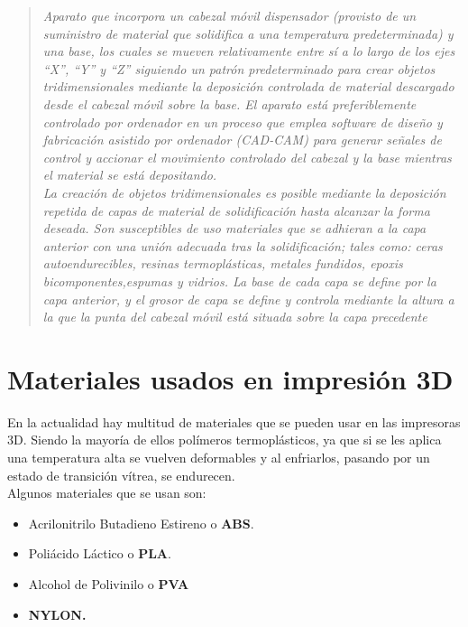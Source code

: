 \begin{quotation}
    \emph{
    Aparato que incorpora un cabezal móvil dispensador (provisto de un suministro de material que solidifica a una temperatura predeterminada) y una base, los cuales se mueven relativamente entre sí a lo largo de los ejes “X”, “Y” y “Z” siguiendo un patrón predeterminado para crear objetos tridimensionales mediante la deposición controlada de material descargado desde el cabezal móvil sobre la base. El aparato está preferiblemente controlado por ordenador en un proceso que emplea software de diseño y fabricación asistido por ordenador (CAD-CAM) para generar señales de control y accionar el movimiento controlado del cabezal y la base mientras el material se está depositando.}\\

    \emph{La creación de objetos tridimensionales es posible mediante la deposición repetida de  capas de material de solidificación hasta alcanzar la forma deseada. Son susceptibles de uso materiales que se adhieran a la capa anterior con una unión adecuada tras la solidificación; tales como: ceras autoendurecibles, resinas termoplásticas, metales fundidos, epoxis bicomponentes,espumas y vidrios. La base de cada capa se define por la capa anterior, y el grosor de capa se define y controla mediante la altura a la que la punta del cabezal móvil está situada sobre la capa precedente}

\end{quotation}

\section{Materiales usados en impresión 3D}
\label{sec:materiales}

En la actualidad hay multitud de materiales que se pueden usar en las impresoras 3D. Siendo la mayoría de ellos polímeros termoplásticos, ya que si se les aplica una temperatura alta se vuelven deformables y al enfriarlos, pasando por un estado de transición vítrea, se endurecen.\\

Algunos materiales que se usan son:
\begin{itemize}
    \item Acrilonitrilo Butadieno Estireno o \textbf{ABS}.
    \item Poliácido Láctico o \textbf{PLA}.
    \item Alcohol de Polivinilo o \textbf{PVA} 
    \item \textbf{NYLON.}
\end{itemize}

